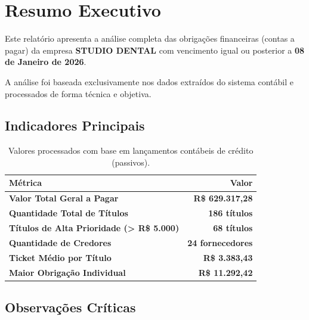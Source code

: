 \documentclass[12pt, a4paper]{article}
\newcommand{\reais}[1]{R\$ #1}
\begin{document}
\section{Resumo Executivo}

Este relatório apresenta a análise completa das obrigações financeiras (contas a pagar) da empresa \textbf{STUDIO DENTAL} com vencimento igual ou posterior a \textbf{08 de Janeiro de 2026}.

A análise foi baseada exclusivamente nos dados extraídos do sistema contábil e processados de forma técnica e objetiva.

\subsection{Indicadores Principais}

\begin{table}[H]
    \centering
    \large
    \renewcommand{\arraystretch}{1.5}
    \begin{tabularx}{0.9\textwidth}{X r}
        \toprule
        \rowcolor{tableHeader} \textbf{Métrica} & \textbf{Valor} \\
        \midrule
        \textbf{Valor Total Geral a Pagar} & \textbf{\reais{629.317,28}} \\
        \textbf{Quantidade Total de Títulos} & \textbf{186 títulos} \\
        \textbf{Títulos de Alta Prioridade (> R\$ 5.000)} & \textbf{68 títulos} \\
        \textbf{Quantidade de Credores} & \textbf{24 fornecedores} \\
        \textbf{Ticket Médio por Título} & \textbf{\reais{3.383,43}} \\
        \midrule
        \rowcolor{accentColor!10} \textbf{Maior Obrigação Individual} & \textcolor{accentColor}{\textbf{\reais{11.292,42}}} \\
        \bottomrule
    \end{tabularx}
    \caption*{\footnotesize Valores processados com base em lançamentos contábeis de crédito (passivos).}
\end{table}

\subsection{Observações Críticas}
\end{document}
